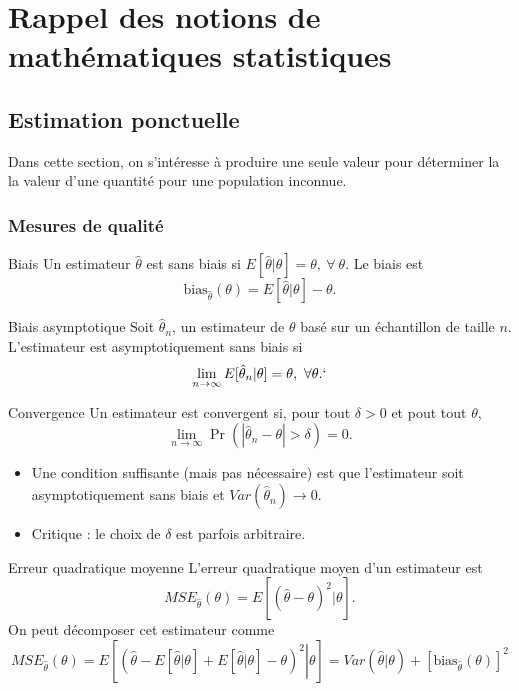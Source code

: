\chapter{Rappel des notions de mathématiques statistiques}

\section{Estimation ponctuelle}

Dans cette section, on s'intéresse à produire une seule valeur pour déterminer la la valeur d'une quantité pour une population inconnue. 

\subsection{Mesures de qualité}

\begin{definition}{Biais}{}
	Un estimateur $\hat{\theta}$ est sans biais si $E[\hat{\theta}\vert \theta] = \theta, ~\forall ~\theta$. Le biais est $$\text{bias}_{\hat{\theta}}(\theta) = E[\hat{\theta}\vert \theta] - \theta.$$
\end{definition}

\begin{definition}{Biais asymptotique}{}
	Soit $\hat{\theta}_n$, un estimateur de $\theta$ basé sur un échantillon de taille $n$. L'estimateur est asymptotiquement sans biais si $$\lim\limits_{n\to \infty }E[\hat{\theta}_n\vert \theta] = \theta, ~\forall \theta.`$$
\end{definition}

\begin{definition}{Convergence}{}
	Un estimateur est convergent si, pour tout $\delta > 0$ et pout tout $\theta$, 
	$$\lim\limits_{n\to \infty} \Pr\left(|\hat{\theta}_n - \theta| > \delta\right) = 0.$$
	\tcblower
	\begin{itemize}
		\item Une condition suffisante (mais pas nécessaire) est que l'estimateur soit asymptotiquement sans biais et $Var\left(\hat{\theta}_n\right) \to 0$.
		\item Critique : le choix de $\delta$ est parfois arbitraire. 
	\end{itemize}
\end{definition}

\begin{definition}{Erreur quadratique moyenne}{}
	L'erreur quadratique moyen d'un estimateur est 
	$$MSE_{\hat{\theta}}(\theta) = E\left[\left(\hat{\theta} - \theta \right)^2 \vert \theta \right].$$
	\tcblower
	On peut décomposer cet estimateur comme
	$$MSE_{\hat{\theta}}(\theta) = E\left[ \left.\left(\hat{\theta} - E[\hat{\theta}\vert \theta] + E[\hat{\theta}\vert \theta] - \theta\right)^2 \right\vert \theta  \right] = Var\left(\hat{\theta}\vert \theta\right) + \left[\text{bias}_{\hat{\theta}}(\theta)\right]^2$$
\end{definition}

